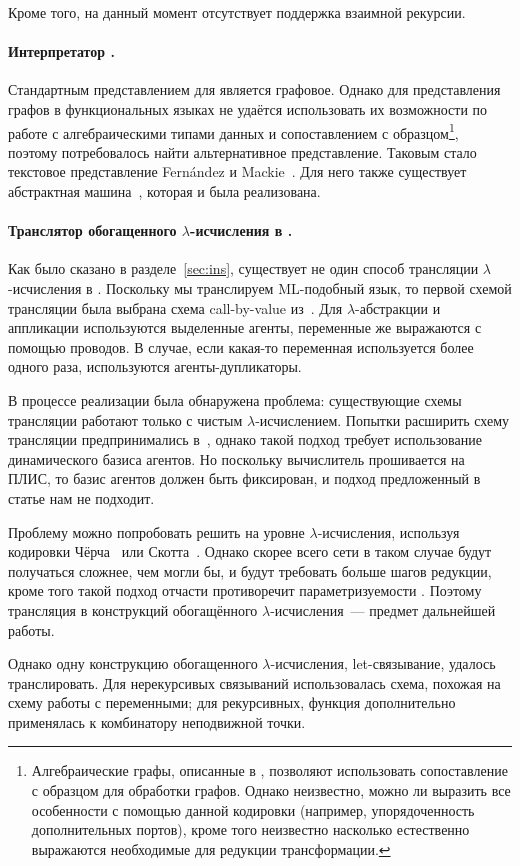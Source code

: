 Кроме того, на данный момент отсутствует поддержка взаимной рекурсии.

\paragraph{Интерпретатор \INs{}.}

Стандартным представлением для \INs{} является графовое.
Однако для представления графов в функциональных языках не удаётся использовать их возможности по работе с алгебраическими типами данных и сопоставлением с образцом\footnote{Алгебраические графы, описанные в \cite{mokhovAlgebraicGraphsClass2017}, позволяют использовать сопоставление с образцом для обработки графов. Однако неизвестно, можно ли выразить все особенности \INs{} с помощью данной кодировки (например, упорядоченность дополнительных портов), кроме того неизвестно насколько естественно выражаются необходимые для редукции трансформации.}, поэтому потребовалось найти альтернативное представление.
Таковым стало текстовое представление Fernández и Mackie~\cite{fernandezCalculusInteractionNets1999}.
Для него также существует абстрактная машина~\cite{pintoSequentialConcurrentAbstract2000}, которая и была реализована.

\paragraph{Транслятор обогащенного $\lambda$-исчисления в \INs{}.}

Как было сказано в разделе~\ref{sec:ins}, существует не один способ трансляции $\lambda$-исчисления в \INs{}.
Поскольку мы транслируем ML-подобный язык, то первой схемой трансляции была выбрана схема call-by-value из~\cite{sinotCallbyNameCallbyValueTokenPassing2005}.
Для $\lambda$-абстракции и аппликации используются выделенные агенты, переменные же выражаются с помощью проводов.
В случае, если какая-то переменная используется более одного раза, используются агенты-дупликаторы.

В процессе реализации была обнаружена проблема: существующие схемы трансляции работают только с чистым $\lambda$-исчислением.
Попытки расширить схему трансляции предпринимались в~\cite{jireschExtendingInteractionNets2012}, однако такой подход требует использование динамического базиса агентов.
Но поскольку вычислитель прошивается на ПЛИС, то базис агентов должен быть фиксирован, и подход предложенный в статье нам не подходит.

Проблему можно попробовать решить на уровне $\lambda$-исчисления, используя кодировки Чёрча~\cite{barendregtImpactLambdaCalculus1997} или Скотта~\cite{koopmanChurchEncodingData2014}.
Однако скорее всего сети в таком случае будут получаться сложнее, чем могли бы, и будут требовать больше шагов редукции, кроме того такой подход отчасти противоречит параметризуемости \INs{}.
Поэтому трансляция в \INs{} конструкций обогащённого $\lambda$-исчисления~--- предмет дальнейшей работы.

Однако одну конструкцию обогащенного $\lambda$-исчисления, let-связывание, удалось  транслировать.
Для нерекурсивых связываний использовалась схема, похожая на схему работы с переменными; для рекурсивных, функция дополнительно применялась к комбинатору неподвижной точки.
